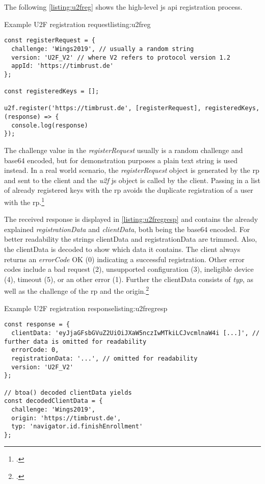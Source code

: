 The following \autoref{listing:u2freg} shows the high-level \gls{js} \gls{api} registration process.
\\
\begin{example}{Example U2F registration request}{listing:u2freg}
\begin{verbatim}
const registerRequest = {
  challenge: 'Wings2019', // usually a random string
  version: 'U2F_V2' // where V2 refers to protocol version 1.2
  appId: 'https://timbrust.de'
};

const registeredKeys = [];

u2f.register('https://timbrust.de', [registerRequest], registeredKeys, (response) => {
  console.log(response)
});
\end{verbatim}
\end{example}

The challenge value in the \textit{registerRequest} usually is a random challenge and base64 encoded, but for demonstration purposes a plain text string is used instead. In a real world scenario, the \textit{registerRequest} object is generated by the \gls{rp} and sent to the client and the \textit{u2f} \gls{js} object is called by the client. Passing in a list of already registered keys with the \gls{rp} avoids the duplicate registration of a user with the \gls{rp}.\footcites[See][3]{u2f-js-api}[See][430]{10.1007/978-3-662-54970-4_25}

The received response is displayed in \autoref{listing:u2fregresp} and contains the already explained \textit{registrationData} and \textit{clientData}, both being the base64 encoded. For better readability the strings clientData and registrationData are trimmed. Also, the clientData is decoded to show which data it contains. The client always returns an \textit{errorCode} OK (0) indicating a successful registration. Other error codes include a bad request (2), unsupported configuration (3), ineligible device (4), timeout (5), or an other error (1). Further the clientData consists of \textit{typ}, as well as the challenge of the \gls{rp} and the origin.\footcites[See][7]{u2f-js-api}[See][8]{u2f-raw-message}

\begin{example}{Example U2F registration response}{listing:u2fregresp}
\begin{verbatim}
const response = {
  clientData: 'eyJjaGFsbGVuZ2UiOiJXaW5nczIwMTkiLCJvcmlnaW4i [...]', // further data is omitted for readability
  errorCode: 0,
  registrationData: '...', // omitted for readability
  version: 'U2F_V2'
};

// btoa() decoded clientData yields
const decodedClientData = {
  challenge: 'Wings2019',
  origin: 'https://timbrust.de',
  typ: 'navigator.id.finishEnrollment'
};
\end{verbatim}
\end{example}

